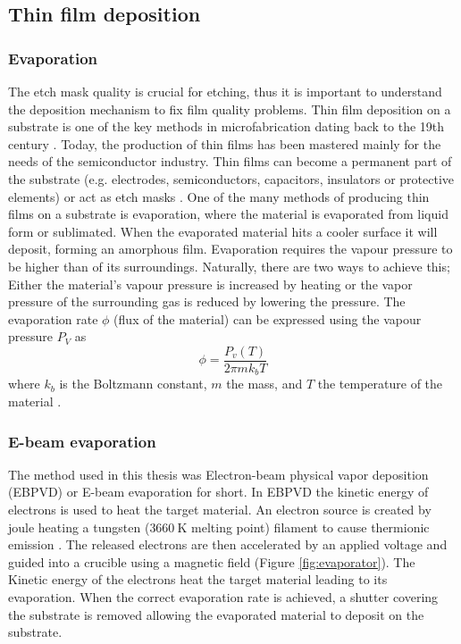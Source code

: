 \documentclass[final]{jyflluk}
\begin{document}
\subsection{Thin film deposition}
\label{sec:xx2}


\subsubsection{Evaporation}

The etch mask quality is crucial for etching, thus it is important to understand the deposition mechanism to fix film quality problems. Thin film deposition on a substrate is one of the key methods in microfabrication dating back to the 19th century \cite{ohring1992materials}.  Today, the production of thin films has been mastered mainly for the needs of the semiconductor industry. Thin films can become a permanent part of the substrate (e.g. electrodes, semiconductors, capacitors, insulators or protective elements) or act as etch masks \cite{franssila2010introduction}. One of the many methods of producing thin films on a substrate is evaporation, where the material is evaporated from liquid form or sublimated. When the evaporated material hits a cooler surface it will deposit, forming an amorphous film. Evaporation requires the vapour pressure to be higher than of its surroundings. Naturally, there are two ways to achieve this; Either the material’s vapour pressure is increased by heating or the vapor pressure of the surrounding gas is reduced by lowering the pressure. The evaporation rate $\phi$ (flux of the material) can be expressed using the vapour pressure $P_V$ as 
%
\begin{equation}
    \label{eq:fluxx}
    \phi = \frac{P_v (T)}{2 \pi m k_b T}
 \end{equation}
where $k_b$ is the Boltzmann constant, $m$ the mass, and $T$ the temperature of the material \cite{franssila2010introduction}.

\subsubsection{E-beam evaporation}

The method used in this thesis was Electron-beam physical vapor deposition (EBPVD) or E-beam evaporation for short. In EBPVD the kinetic energy of electrons is used to heat the target material. An electron source is created by joule heating a tungsten ($\SI{3660}{\kelvin}$ melting point) filament to cause thermionic emission \cite{franssila2010introduction}. The released electrons are then accelerated by an applied voltage and guided into a crucible using a magnetic field (Figure \ref{fig:evaporator}). The Kinetic energy of the electrons heat the target material leading to its evaporation. When the correct evaporation rate is achieved, a shutter covering the substrate is removed allowing the evaporated material to deposit on the substrate.
\end{document}
